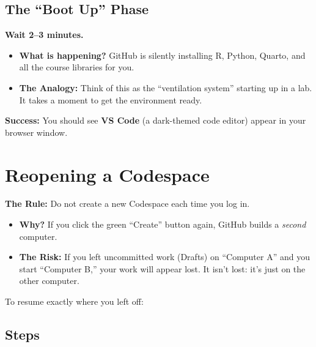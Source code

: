 \documentclass[
  letterpaper,
  DIV=11,
  numbers=noendperiod,
  oneside]{scrreprt}
\providecommand{\tightlist}{%
  \setlength{\itemsep}{0pt}\setlength{\parskip}{0pt}}
\begin{document}
\section{The ``Boot Up'' Phase}\label{the-boot-up-phase}

\textbf{Wait 2--3 minutes.}

\begin{itemize}
\tightlist
\item
  \textbf{What is happening?} GitHub is silently installing R, Python,
  Quarto, and all the course libraries for you.
\item
  \textbf{The Analogy:} Think of this as the ``ventilation system''
  starting up in a lab. It takes a moment to get the environment ready.
\end{itemize}

\textbf{Success:} You should see \textbf{VS Code} (a dark-themed code
editor) appear in your browser window.

\chapter{Reopening a Codespace}\label{reopening-a-codespace}

\textbf{The Rule:} Do not create a new Codespace each time you log in.

\begin{itemize}
\tightlist
\item
  \textbf{Why?} If you click the green ``Create'' button again, GitHub
  builds a \emph{second} computer.
\item
  \textbf{The Risk:} If you left uncommitted work (Drafts) on ``Computer
  A'' and you start ``Computer B,'' your work will appear lost. It isn't
  lost: it's just on the other computer.
\end{itemize}

To resume exactly where you left off:

\section{Steps}\label{steps-1}
\end{document}
